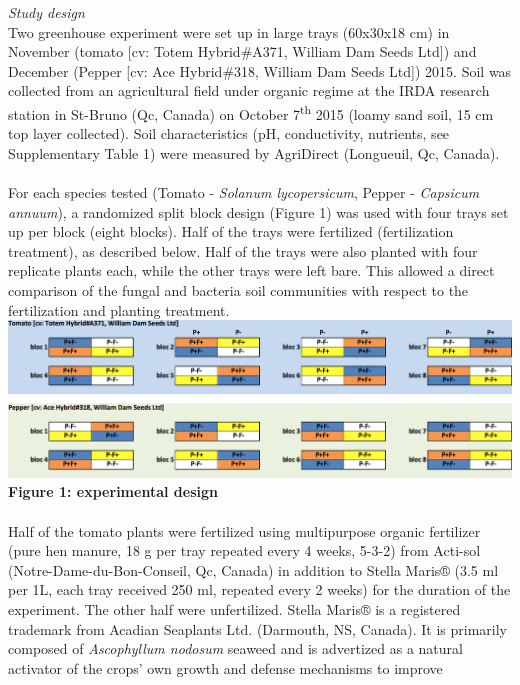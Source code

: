\documentclass[11pt,]{article}
\begin{document}
\emph{Study design}\\
Two greenhouse experiment were set up in large trays (60x30x18 cm) in
November (tomato {[}cv: Totem Hybrid\#A371, William Dam Seeds Ltd{]})
and December (Pepper {[}cv: Ace Hybrid\#318, William Dam Seeds Ltd{]})
2015. Soil was collected from an agricultural field under organic regime
at the IRDA research station in St-Bruno (Qc, Canada) on October
7\textsuperscript{th} 2015 (loamy sand soil, 15 cm top layer collected).
Soil characteristics (pH, conductivity, nutrients, see Supplementary
Table 1) were measured by AgriDirect (Longueuil, Qc, Canada).\\
\hspace*{0.333em}\\
For each species tested (Tomato - \emph{Solanum lycopersicum}, Pepper -
\emph{Capsicum annuum}), a randomized split block design (Figure 1) was
used with four trays set up per block (eight blocks). Half of the trays
were fertilized (fertilization treatment), as described below. Half of
the trays were also planted with four replicate plants each, while the
other trays were left bare. This allowed a direct comparison of the
fungal and bacteria soil communities with respect to the fertilization
and planting treatment. ~\\
\includegraphics[width=6.25000in]{../figures/Figure1.png}\\
\textbf{Figure 1: experimental design}\\
\hspace*{0.333em}\\
Half of the tomato plants were fertilized using multipurpose organic
fertilizer (pure hen manure, 18 g per tray repeated every 4 weeks,
5-3-2) from Acti-sol (Notre-Dame-du-Bon-Conseil, Qc, Canada) in addition
to Stella Maris® (3.5 ml per 1L, each tray received 250 ml, repeated
every 2 weeks) for the duration of the experiment. The other half were
unfertilized. Stella Maris® is a registered trademark from Acadian
Seaplants Ltd. (Darmouth, NS, Canada). It is primarily composed of
\emph{Ascophyllum nodosum} seaweed and is advertized as a natural
activator of the crops' own growth and defense mechanisms to improve
\end{document}
